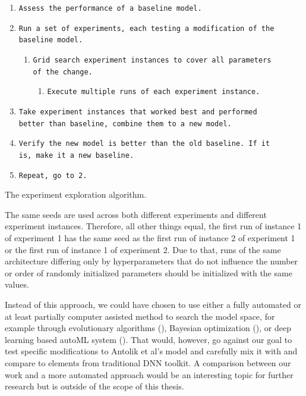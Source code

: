\begin{enumerate}[noitemsep]
    \item \texttt{Assess the performance of a baseline model.}
    \item \texttt{Run a set of experiments, each testing a modification of the\\ baseline model.}
    \begin{enumerate}[nosep]
        \item \texttt{Grid search experiment instances to cover all parameters\\ of the change.}
        \begin{enumerate}[nosep]
            \item \texttt{Execute multiple runs of each experiment instance.}
        \end{enumerate}
    \end{enumerate}
    \item \texttt{Take experiment instances that worked best and performed\\ better than baseline, combine them to a new model.}
    \item \texttt{Verify the new model is better than the old baseline. If it\\ is, make it a new baseline.}
    \item \texttt{Repeat, go to 2.}
\end{enumerate}
\begin{center}
    {The experiment exploration algorithm.}
\end{center}

The same seeds are used across both different experiments and different experiment instances. Therefore, all other things equal, the first run of instance 1 of experiment 1 has the same seed as the first run of instance 2 of experiment 1 or the first run of instance 1 of experiment 2. Due to that, runs of the same architecture differing only by hyperparameters that do not influence the number or order of randomly initialized parameters should be initialized with the same values.

Instead of this approach, we could have chosen to use either a fully automated or at least partially computer assisted method to search the model space, for example through evolutionary algorithms (\citep{2017arXiv170300548M}), Bayesian optimization (\citep{thesis_arnold}), or deep learning based autoML system (\citep{2016arXiv161101578Z}). That would, however, go against our goal to test specific modifications to Antolik et al’s model and carefully mix it with and compare to elements from traditional DNN toolkit. A comparison between our work and a more automated approach would be an interesting topic for further research but is outside of the scope of this thesis.

